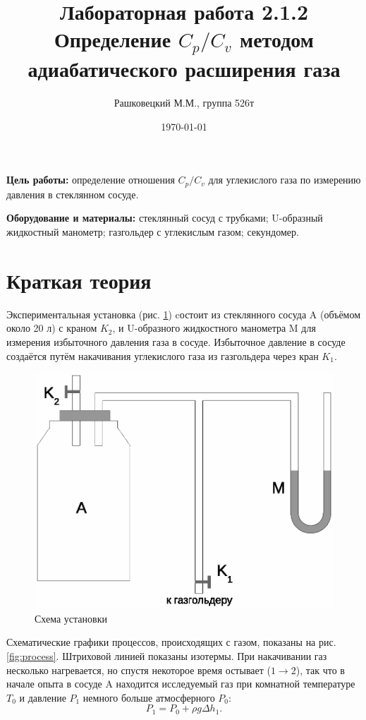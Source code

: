 \documentclass[12pt]{article}
\author{Рашковецкий М.М., группа 526т}
\date{\today}
\title{Лабораторная работа 2.1.2\\Определение $C_p/C_v$ методом адиабатического расширения газа}
\begin{document}
	\maketitle
	
	{\parindent=1cm \hangindent=1cm \parskip=0.5cm
	{\bfseries Цель работы:} определение отношения $C_p/C_v$ для углекислого газа по измерению давления в стеклянном сосуде.
	
	\hangindent=1cm
	{\bfseries Оборудование и материалы:} стеклянный сосуд с трубками; U-образный жидкостный манометр; газгольдер с углекислым газом; секундомер.\par}
	\section*{Краткая теория}
	
	\indent Экспериментальная установка (рис. \ref{fig:scheme}) cостоит из стеклянного сосуда A (объёмом около 20 л) с краном $K_2$, и U-образного жидкостного манометра M для измерения избыточного давления газа в сосуде. Избыточное давление в сосуде создаётся путём накачивания углекислого газа из газгольдера через кран $K_1$.
	
	\begin{figure}[h!]
	\caption{Схема установки}
	\label{fig:scheme}
	\begin{center}
	\includegraphics[scale=0.7]{scheme.eps}
	\end{center}
	\end{figure}
	
	Схематические графики процессов, происходящих с газом, показаны на рис. \ref{fig:process}. Штриховой линией показаны изотермы. При накачивании газ несколько нагревается, но спустя некоторое время остывает ($1 \rightarrow 2$), так что в начале опыта в сосуде A находится исследуемый газ при комнатной температуре $T_0$ и давление $P_1$ немного больше атмосферного $P_0$:
	\begin{equation}
	\label{eq:pressure_base_1}
	P_1=P_0+\rho g\Delta h_1.
	\end{equation}
	
\end{document}
